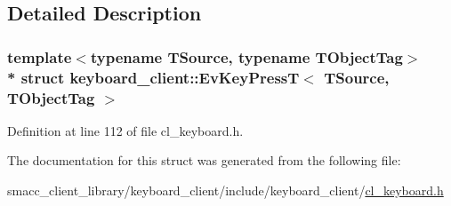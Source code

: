 \subsection{Detailed Description}
\subsubsection*{template$<$typename T\+Source, typename T\+Object\+Tag$>$\\*
struct keyboard\+\_\+client\+::\+Ev\+Key\+Press\+T$<$ T\+Source, T\+Object\+Tag $>$}



Definition at line 112 of file cl\+\_\+keyboard.\+h.



The documentation for this struct was generated from the following file\+:\begin{DoxyCompactItemize}
\item 
smacc\+\_\+client\+\_\+library/keyboard\+\_\+client/include/keyboard\+\_\+client/\hyperlink{cl__keyboard_8h}{cl\+\_\+keyboard.\+h}\end{DoxyCompactItemize}
